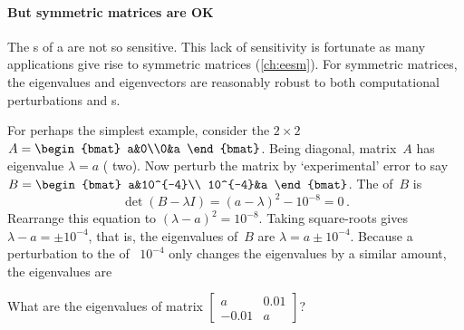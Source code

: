 
\paragraph{But symmetric matrices are OK}
The s of a  are not so sensitive.
This lack of sensitivity is fortunate as many applications give rise to symmetric matrices (\cref{ch:eesm}).
For symmetric matrices, the eigenvalues and eigenvectors are reasonably robust to both computational perturbations and s.




\begin{example} 
For perhaps the simplest example, consider the \(2\times2\)  \(A=\begin{bmat} a&0\\0&a \end{bmat}\).
Being diagonal, matrix~\(A\) has eigenvalue \(\lambda=a\) ( two).
Now perturb the matrix by `experimental' error to say \(B=\begin{bmat} a&10^{-4}\\ 10^{-4}&a \end{bmat}\).
The  of~\(B\) is
\begin{equation*}
\det(B-\lambda I)=(a-\lambda)^2-10^{-8}=0\,.
\end{equation*}
Rearrange this equation to \((\lambda-a)^2=10^{-8}\).  
Taking square-roots gives \(\lambda-a=\pm 10^{-4}\), that is, the eigenvalues of~\(B\) are \(\lambda=a\pm10^{-4}\).
Because a perturbation to the  of ~\(10^{-4}\) only changes the eigenvalues by a similar amount, the eigenvalues are 
\end{example}





\begin{activity}
What are the eigenvalues of matrix \(\begin{bmatrix} a&0.01\\-0.01&a \end{bmatrix}\)?
\end{activity}





